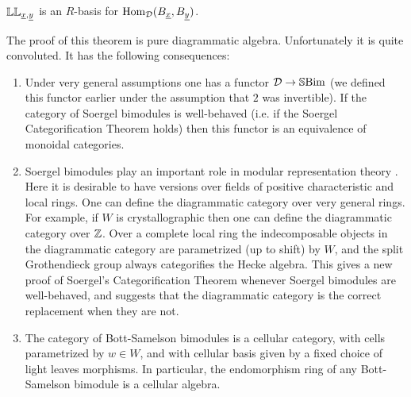 \begin{thm} $\mathbb{LL}_{\underline{x},\underline{y}}$ is an $R$-basis for $\operatorname{Hom}_{{\mathcal{D}}}(B_{\underline{x}}, B_{\underline{y}})$. \end{thm}

The proof of this theorem is pure diagrammatic algebra. Unfortunately it is quite convoluted. It has the following consequences:
\begin{enumerate}
\item Under very general assumptions one has a functor ${\mathcal{D}} \rightarrow \mathbb{S}\textrm{Bim}$ (we defined this functor earlier under the assumption that $2$ was invertible).  If the category of Soergel bimodules is well-behaved (i.e. if the Soergel Categorification Theorem holds) then this functor is an equivalence of monoidal categories.
\item Soergel bimodules play an important role in modular representation theory \cite{Soergel, FiebigJAMS}.
Here it is desirable to have versions over fields of positive characteristic and local rings. One can define the diagrammatic category over very general rings. For example, if $W$ is crystallographic then one can define the diagrammatic category over ${\mathbb{Z}}$. Over a complete local ring the indecomposable objects in the diagrammatic category are parametrized (up to shift) by $W$, and the split Grothendieck group always categorifies the Hecke algebra. This gives a new proof of Soergel's Categorification Theorem whenever Soergel bimodules are well-behaved, and suggests that the diagrammatic category is the correct replacement when they are not.
\item The category of Bott-Samelson bimodules is a cellular category, with cells parametrized by $w \in W$, and with cellular basis given by a fixed choice of light leaves morphisms. In particular, the endomorphism ring of any Bott-Samelson bimodule is a cellular algebra.
\end{enumerate}



